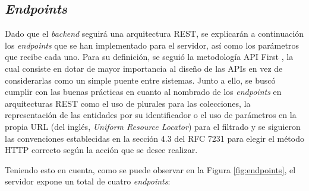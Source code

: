 \subsection{\textit{Endpoints}}

Dado que el \textit{backend} seguirá una arquitectura REST, se explicarán a continuación los \textit{endpoints} que se han implementado para el servidor, así como los parámetros
que recibe cada uno. Para su definición, se seguió la metodología API First \cite{apifirst}, la cual consiste en dotar de mayor importancia al diseño de las APIs en vez de
considerarlas como un simple puente entre sistemas. Junto a ello, se buscó cumplir con las buenas prácticas en cuanto al nombrado de los \textit{endpoints} en arquitecturas REST como el
uso de plurales para las colecciones, la representación de las entidades por su identificador o el uso de parámetros en la propia URL (del inglés, \textit{Uniform Resource Locator})
para el filtrado y se siguieron las convenciones establecidas
en la sección 4.3 del RFC 7231 \cite{rfc7231} para elegir el método HTTP correcto según la acción que se desee realizar.

\bigskip
Teniendo esto en cuenta, como se puede observar en la Figura \ref{fig:endpoints}, el servidor expone un total de cuatro \textit{endpoints}:


